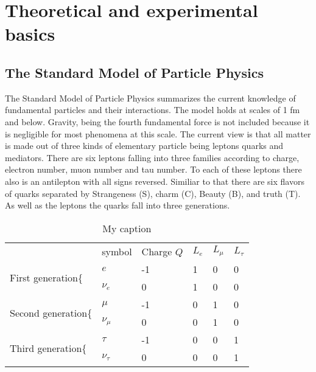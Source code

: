 \chapter{Theoretical and experimental basics}
\label{theory}

\section{The Standard Model of Particle Physics}

The Standard Model of Particle Physics summarizes the current knowledge of fundamental particles and their interactions. The model holds at scales of 1 fm and below. Gravity, being the fourth fundamental force is not included because it is negligible for most phenomena at this scale.
The current view is that all matter is made out of three kinds of elementary particle being leptons quarks and mediators.
There are six leptons falling into three families according to charge, electron number, muon number and tau number. To each of these leptons there also is an antilepton with all signs reversed.
Similiar to that there are six flavors of quarks separated by Strangeness (S), charm (C), Beauty (B), and truth (T). As well as the leptons the quarks fall into three generations.


\begin{table}[]
\centering
\caption{My caption}
\label{my-label}
\begin{tabular}{l|l|l|l|l|l|}
\cline{2-6}
                                   & symbol        & Charge $Q$ & $L_e$ & $L_{\mu}$ & $L_{\tau}$ \\ \cline{2-6} 
\multirow{2}{*}{First generation\{}  & $e$             & -1       & 1    & 0          & 0           \\ \cline{2-6} 
                                   & $\nu_e$        & 0        & 1    & 0          & 0           \\ \cline{2-6} 
\multirow{2}{*}{Second generation\{} & $\mu$           & -1       & 0    & 1          & 0           \\ \cline{2-6} 
                                   & $\nu_{\mu}$  & 0        & 0    & 1          & 0           \\ \cline{2-6} 
\multirow{2}{*}{Third generation\{}  & $\tau$          & -1       & 0    & 0          & 1           \\ \cline{2-6} 
                                   & $\nu_{\tau}$ & 0        & 0    & 0          & 1           \\ \cline{2-6} 
\end{tabular}
\end{table}


